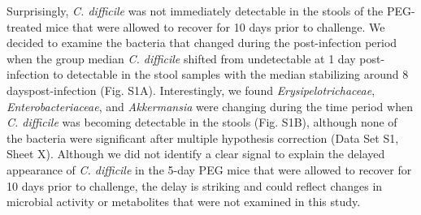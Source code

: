 \documentclass[
  11pt,
]{article}
\begin{document}
Surprisingly, \emph{C. difficile} was not immediately detectable in the
stools of the PEG-treated mice that were allowed to recover for 10 days
prior to challenge. We decided to examine the bacteria that changed
during the post-infection period when the group median \emph{C.
difficile} shifted from undetectable at 1 day post-infection to
detectable in the stool samples with the median stabilizing around 8
dayspost-infection (Fig. S1A). Interestingly, we found
\emph{Erysipelotrichaceae}, \emph{Enterobacteriaceae}, and
\emph{Akkermansia} were changing during the time period when \emph{C.
difficile} was becoming detectable in the stools (Fig. S1B), although
none of the bacteria were significant after multiple hypothesis
correction (Data Set S1, Sheet X). Although we did not identify a clear
signal to explain the delayed appearance of \emph{C. difficile} in the
5-day PEG mice that were allowed to recover for 10 days prior to
challenge, the delay is striking and could reflect changes in microbial
activity or metabolites that were not examined in this study.
\end{document}
